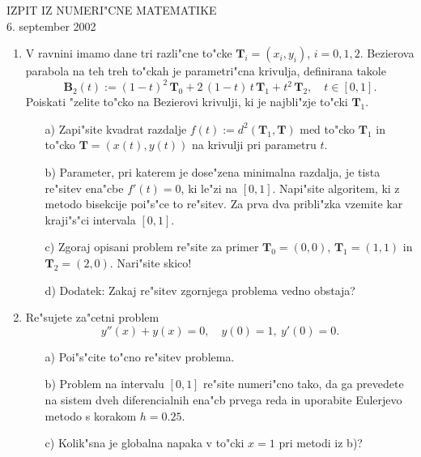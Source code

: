 
\begin{center}
  IZPIT IZ NUMERI"CNE MATEMATIKE\\
  6. september 2002
\end{center}

\begin{enumerate}

  \item V ravnini imamo dane tri razli"cne 
    to"cke $\mathbf{T}_i=(x_i,y_i)$, $i=0,1,2$.
    Bezierova parabola na teh treh to"ckah je parametri"cna krivulja,
    definirana takole
    $$\mathbf{B}_2(t):=(1-t)^2\,\mathbf{T}_0+2\,(1-t)\,t\,\mathbf{T}_1+
    t^2\,\mathbf{T}_2,\quad t\in[0,1].
    $$
    Poiskati "zelite to"cko na Bezierovi krivulji, ki je najbli"zje to"cki
    $\mathbf{T}_1$.
    \begin{itemize}
    \item[a)] Zapi"site kvadrat razdalje $f(t):=d^2(\mathbf{T}_1,\mathbf{T})$
      med to"cko $\mathbf{T}_1$ in
      to"cko $\mathbf{T}=(x(t),y(t))$ na krivulji pri parametru $t$.
    \item[b)] Parameter, pri katerem je dose"zena minimalna razdalja, je
      tista re"sitev ena"cbe $f'(t)=0$, ki le"zi na $[0,1]$. 
      Napi"site algoritem, ki z metodo bisekcije poi"s"ce to re"sitev. 
      Za prva dva pribli"zka vzemite kar kraji"s"ci intervala $[0,1]$.
    \item[c)] Zgoraj opisani problem re"site za primer
      $\mathbf{T}_0=(0,0)$, $\mathbf{T}_1=(1,1)$ in $\mathbf{T}_2=(2,0)$.
      Nari"site skico!
    \item[d)] Dodatek: Zakaj re"sitev zgornjega problema vedno obstaja?
    \end{itemize}
    
  \item Re"sujete za"cetni problem
    $$y''(x)+y(x)=0,\quad y(0)=1,\ y'(0)=0.
    $$
    \begin{itemize}
      \item[a)] Poi"s"cite to"cno re"sitev problema.
      \item[b)] Problem na intervalu $[0,1]$ re"site numeri"cno tako, da
        ga prevedete na sistem dveh diferencialnih ena"cb prvega reda in
        uporabite Eulerjevo metodo s korakom $h=0.25$.
      \item[c)] Kolik"sna je globalna napaka v to"cki $x=1$ pri metodi iz b)?
    \end{itemize}
\end{enumerate}



         
